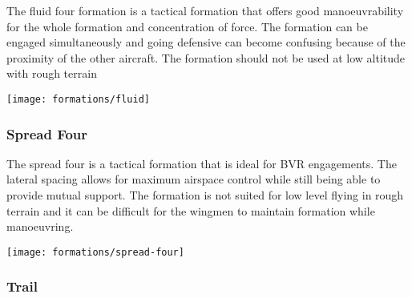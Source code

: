 The fluid four formation is a tactical formation that offers good
manoeuvrability for the whole formation and concentration of force. The
formation can be engaged simultaneously and going defensive can become
confusing because of the proximity of the other aircraft. The formation should
not be used at low altitude with rough terrain

\begin{center}
  \texttt{[image: formations/fluid]}%
\end{center}


\subsubsection{Spread Four}

The spread four is a tactical formation that is ideal for BVR engagements. The
lateral spacing allows for maximum airspace control while still being able to
provide mutual support. The formation is not suited for low level flying in
rough terrain and it can be difficult for the wingmen to maintain formation
while manoeuvring.

\begin{center}
  \texttt{[image: formations/spread-four]}%
\end{center}


\subsubsection{Trail}


